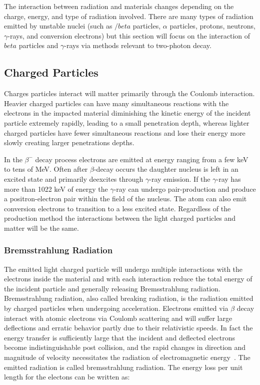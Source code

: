 \documentclass[cnatzke_thesis_proposal.tex]{subfiles}
\begin{document}
The interaction between radiation and materials changes depending on the charge, energy, and type of radiation involved. There are many types of radiation emitted by unstable nuclei (such as $/beta$ particles, $\alpha$ particles, protons, neutrons, $\gamma$-rays, and conversion electrons) but this section will focus on the interaction of $beta$ particles and $\gamma$-rays via methods relevant to two-photon decay.

\subsection{Charged Particles}
Charges particles interact will matter primarily through the Coulomb interaction. Heavier charged particles can have many simultaneous reactions with the electrons in the impacted material diminishing the kinetic energy of the incident particle extremely rapidly, leading to a small penetration depth, whereas lighter charged particles have fewer simultaneous reactions and lose their energy more slowly creating larger penetrations depths. 

In the $\beta^-$ decay process electrons are emitted at energy ranging from a few keV to tens of MeV. Often after $\beta$-decay occurs the daughter nucleus is left in an excited state and primarily deexcites through $\gamma$-ray emission. If the $\gamma$-ray has more than 1022 keV of energy the $\gamma$-ray can undergo pair-production and produce a positron-electron pair within the field of the nucleus. The atom can also emit conversion electrons to transition to a less excited state. Regardless of the production method the interactions between the light charged particles and matter will be the same.

\subsubsection{Bremsstrahlung Radiation}
\label{sec:bremsstrahlung_radiation}
The emitted light charged particle will undergo multiple interactions with the electrons inside the material and with each interaction reduce the total energy of the incident particle and generally releasing Bremsstrahlung radiation.
Bremsstrahlung radiation, also called breaking radiation, is the radiation emitted by charged particles when undergoing acceleration. 
Electrons emitted via $\beta$ decay interact with atomic electrons via Coulomb scattering and will suffer large deflections and erratic behavior partly due to their relativistic speeds.
In fact the energy transfer is sufficiently large that the incident and deflected electrons become indistinguishable post collision, and the rapid changes in direction and magnitude of velocity necessitates the radiation of electromagnetic energy~\cite{krane_introductory_1987}.
The emitted radiation is called bremsstrahlung radiation. 
The energy loss per unit length for the electons can be written as: 
\end{document}
